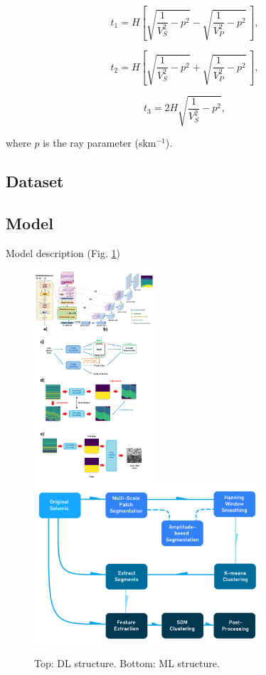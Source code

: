 \documentclass[12pt,twoside]{article}
\begin{document}
\begin{equation}
t_{1}= H\left[{\sqrt{\frac{1}{V_{S}^{2}}-p^{2}} - \sqrt{\frac{1}{V_{P}^{2}}-p^{2}}} \,\right],
\label{RFStravelT1}
\end{equation}

\begin{equation}
t_{2}=H\left[{\sqrt{\frac{1}{V_{S}^{2}}-p^{2}} + \sqrt{\frac{1}{V_{P}^{2}}-p^{2}}}\,\right],
\label{RFStravelT2}
\end{equation}

\begin{equation}
t_{3}=2H\sqrt{\frac{1}{V_{S}^{2}}-p^{2}},
\label{RFStravelT3}
\end{equation}

where $p$ is the ray parameter (skm$^{-1}$).

\subsection{Dataset}

\subsection{Model}
Model description (Fig. \ref{model_structure})

\begin{figure}[tbhp]
\centering
\includegraphics[width=0.4\textwidth, angle=0]{figures/dl_model_structure_full.png}
\vspace{0.5cm}
\includegraphics[width=0.75\textwidth, angle=0]{figures/unsupervised_structure.png}
\caption[Model Structure] {Top: DL structure. Bottom: ML structure. \citep{vwxg}}
\label{model_structure}
\end{figure}
\end{document}
